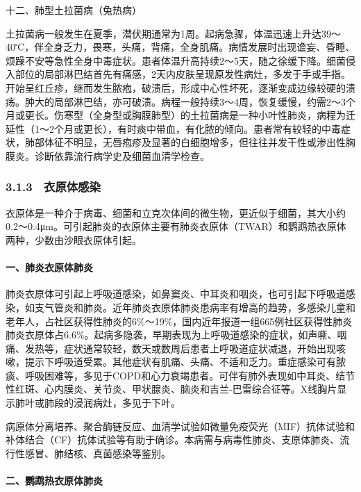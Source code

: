 \hypertarget{text00025.htmlux5cux23CHP2-7-1-2-12}{}
十二、肺型土拉菌病（兔热病）

土拉菌病一般发生在夏季，潜伏期通常为1周。起病急骤，体温迅速上升达39～40℃，伴全身乏力，畏寒，头痛，背痛，全身肌痛。病情发展时出现谵妄、昏睡、烦躁不安等急性全身中毒症状。患者体温升高持续2～5天，随之徐缓下降。细菌侵入部位的局部淋巴结首先有痛感，2天内皮肤呈现原发性病灶，多发于手或手指。开始呈红丘疹，继而发生脓疱，破溃后，形成中心性坏死，逐渐变成边缘较硬的溃疡。肿大的局部淋巴结，亦可破溃。病程一般持续3～4周，恢复缓慢，约需2～3个月或更长。伤寒型（全身型或胸膜肺型）的土拉菌病是一种小叶性肺炎，病程为迁延性（1～2个月或更长），有时痰中带血，有化脓的倾向。患者常有较轻的中毒症状，肺部体征不明显，无唇疱疹及显著的白细胞增多，但往往并发干性或渗出性胸膜炎。诊断依靠流行病学史及细菌血清学检查。

\subsubsection{3.1.3　衣原体感染}

衣原体是一种介于病毒、细菌和立克次体间的微生物，更近似于细菌，其大小约0.2～0.4μm。可引起肺炎的衣原体主要有肺炎衣原体（TWAR）和鹦鹉热衣原体两种，少数由沙眼衣原体引起。

\paragraph{一、肺炎衣原体肺炎}

肺炎衣原体可引起上呼吸道感染，如鼻窦炎、中耳炎和咽炎，也可引起下呼吸道感染，如支气管炎和肺炎。近年肺炎衣原体肺炎患病率有增高的趋势，多感染儿童和老年人，占社区获得性肺炎的6\%～19\%，国内近年报道一组665例社区获得性肺炎肺炎衣原体占6.6\%。起病多隐袭，早期表现为上呼吸道感染的症状，如声嘶、咽痛、发热等，症状通常较轻，数天或数周后患者上呼吸道症状减退，开始出现咳嗽，提示下呼吸道受累。其他症状有肌痛、头痛、不适和乏力。重症感染可有脓痰、呼吸困难等，多见于COPD和心力衰竭患者。可伴有肺外表现如中耳炎、结节性红斑、心内膜炎、关节炎、甲状腺炎、脑炎和吉兰-巴雷综合征等。X线胸片显示肺叶或肺段的浸润病灶，多见于下叶。

病原体分离培养、聚合酶链反应、血清学试验如微量免疫荧光（MIF）抗体试验和补体结合（CF）抗体试验等有助于确诊。本病需与病毒性肺炎、支原体肺炎、流行性感冒、肺结核、真菌感染等鉴别。

\paragraph{二、鹦鹉热衣原体肺炎}

